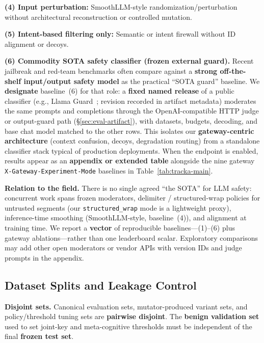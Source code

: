 \documentclass[letterpaper,twocolumn,10pt]{article}
\begin{document}
\textbf{(4) Input perturbation:} SmoothLLM-style randomization/perturbation without architectural reconstruction or controlled mutation.

\textbf{(5) Intent-based filtering only:} Semantic or intent firewall without ID alignment or decoys.

\textbf{(6) Commodity SOTA safety classifier (frozen external guard).} Recent jailbreak and red-team benchmarks often compare against a \textbf{strong off-the-shelf input/output safety model} as the practical ``SOTA guard'' baseline. We \textbf{designate} baseline~(6) for that role: a \textbf{fixed named release} of a public classifier (e.g., Llama Guard~\cite{llama-guard}; revision recorded in artifact metadata) moderates the same prompts and completions through the OpenAI-compatible HTTP judge or output-guard path (\S\ref{sec:eval-artifact}), with datasets, budgets, decoding, and base chat model matched to the other rows. This isolates our \textbf{gateway-centric architecture} (context confusion, decoys, degradation routing) from a standalone classifier stack typical of production deployments. When the endpoint is enabled, results appear as an \textbf{appendix or extended table} alongside the nine gateway \texttt{X-Gateway-Experiment-Mode} baselines in Table~\ref{tab:tracka-main}.

\noindent\textbf{Relation to the field.} There is no single agreed ``the SOTA'' for LLM safety: concurrent work spans frozen moderators, delimiter / structured-wrap policies for untrusted segments (our \texttt{structured\_wrap} mode is a lightweight proxy), inference-time smoothing (SmoothLLM-style, baseline~(4)), and alignment at training time. We report a \textbf{vector} of reproducible baselines---(1)--(6) plus gateway ablations---rather than one leaderboard scalar. Exploratory comparisons may add other open moderators or vendor APIs with version IDs and judge prompts in the appendix.

\subsection{Dataset Splits and Leakage Control}
\label{sec:eval-splits}

\textbf{Disjoint sets.} Canonical evaluation sets, mutator-produced variant sets, and policy/threshold tuning sets are \textbf{pairwise disjoint}. The \textbf{benign validation set} used to set joint-key and meta-cognitive thresholds must be independent of the final \textbf{frozen test set}.
\end{document}
